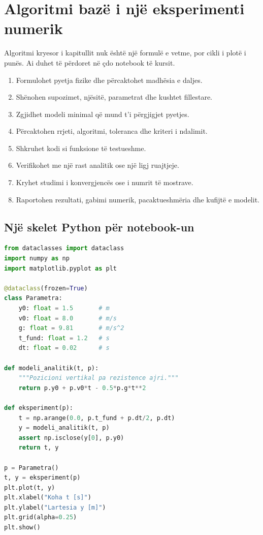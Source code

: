 \section{Algoritmi bazë i një eksperimenti numerik}
Algoritmi kryesor i kapitullit nuk është një formulë e vetme, por cikli i plotë i punës. Ai duhet të përdoret në çdo notebook të kursit.

\begin{enumerate}
\item Formulohet pyetja fizike dhe përcaktohet madhësia e daljes.
\item Shënohen supozimet, njësitë, parametrat dhe kushtet fillestare.
\item Zgjidhet modeli minimal që mund t'i përgjigjet pyetjes.
\item Përcaktohen rrjeti, algoritmi, toleranca dhe kriteri i ndalimit.
\item Shkruhet kodi si funksione të testueshme.
\item Verifikohet me një rast analitik ose një ligj ruajtjeje.
\item Kryhet studimi i konvergjencës ose i numrit të mostrave.
\item Raportohen rezultati, gabimi numerik, pacaktueshmëria dhe kufijtë e modelit.
\end{enumerate}

\subsection{Një skelet Python për notebook-un}
\begin{lstlisting}[language=Python,caption={Skelet minimal për një eksperiment numerik.}]
from dataclasses import dataclass
import numpy as np
import matplotlib.pyplot as plt

@dataclass(frozen=True)
class Parametra:
    y0: float = 1.5       # m
    v0: float = 8.0       # m/s
    g: float = 9.81       # m/s^2
    t_fund: float = 1.2   # s
    dt: float = 0.02      # s

def modeli_analitik(t, p):
    """Pozicioni vertikal pa rezistence ajri."""
    return p.y0 + p.v0*t - 0.5*p.g*t**2

def eksperiment(p):
    t = np.arange(0.0, p.t_fund + p.dt/2, p.dt)
    y = modeli_analitik(t, p)
    assert np.isclose(y[0], p.y0)
    return t, y

p = Parametra()
t, y = eksperiment(p)
plt.plot(t, y)
plt.xlabel("Koha t [s]")
plt.ylabel("Lartesia y [m]")
plt.grid(alpha=0.25)
plt.show()
\end{lstlisting}

